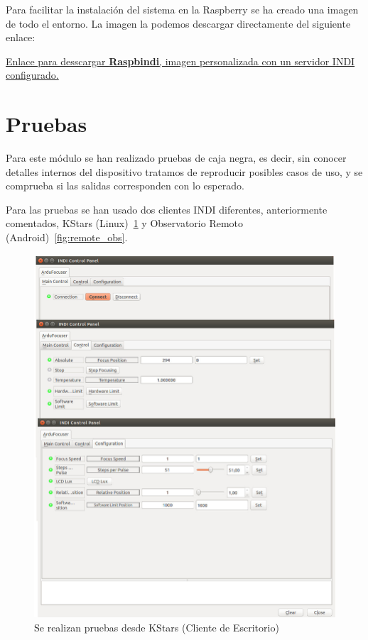 Para facilitar la instalación del sistema en la Raspberry se ha creado una imagen de todo el entorno. La imagen la podemos descargar directamente del siguiente enlace:


\href{https://drive.google.com/open?id=0Bz7iXJ4BvZ9SbnJPZWkweVhUVjQ}{Enlace para desscargar \textbf{Raspbindi}, imagen personalizada con un servidor INDI configurado.}






\section{Pruebas}

Para este módulo se han realizado pruebas de caja negra, es decir, sin conocer detalles internos del dispositivo tratamos de reproducir posibles casos de uso, y se comprueba si las salidas corresponden con lo esperado. 


Para las pruebas se han usado dos clientes INDI diferentes, anteriormente comentados, KStars (Linux)~\ref{fig:kstar_driver1} y  Observatorio Remoto (Android)~\ref{fig:remote_obs}.


\begin{figure}
	\centering
	\includegraphics[width=0.8\linewidth]{../images/kstar_driver_full}
	\caption[Pruebas desde KStars]{Se realizan pruebas desde KStars (Cliente de Escritorio)}
	\label{fig:kstar_driver1}
\end{figure}

